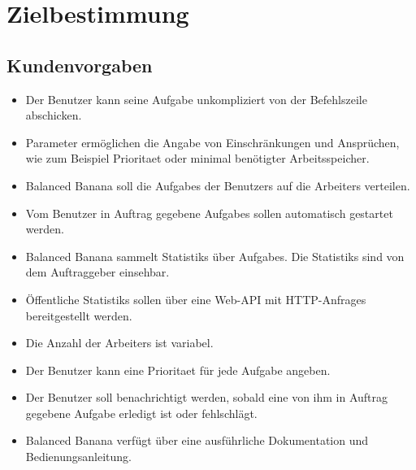 \documentclass[a4paper,12pt]{article}
\begin{document}
\clearpage
\section{Zielbestimmung}
\subsection{Kundenvorgaben}
\begin{itemize}[nosep]
	
	\item Der \gls{Benutzer} kann seine \gls{Aufgabe} unkompliziert von der \gls{Befehlszeile} abschicken.
	
	\item \gls{Parameter} ermöglichen die Angabe von Einschränkungen und Ansprüchen, wie zum Beispiel \gls{Prioritaet} oder minimal benötigter Arbeitsspeicher.
		
	\item Balanced Banana soll die \glspl{Aufgabe} der \glspl{Benutzer} auf die \glspl{Arbeiter} verteilen.
	
	\item Vom \gls{Benutzer} in Auftrag gegebene \glspl{Aufgabe} sollen automatisch gestartet werden.
	
	\item Balanced Banana sammelt \glspl{Statistik} über \glspl{Aufgabe}. Die \glspl{Statistik} sind von dem \gls{Auftraggeber} einsehbar.
	
	\item Öffentliche \glspl{Statistik} sollen über eine \gls{Web-API} mit \glspl{HTTP-Anfrage} bereitgestellt werden.
	
	\item Die Anzahl der \glspl{Arbeiter} ist variabel.
	
	\item Der \gls{Benutzer} kann eine \gls{Prioritaet} für jede \gls{Aufgabe} angeben.
	
	\item Der \gls{Benutzer} soll benachrichtigt werden, sobald eine von ihm in Auftrag gegebene \gls{Aufgabe} erledigt ist oder fehlschlägt.
	
	\item Balanced Banana verfügt über eine ausführliche Dokumentation und Bedienungsanleitung.

\end{itemize}
\end{document}
